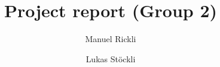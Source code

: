 
\title{Project report (Group 2)}
\author{Manuel Rickli \and Lukas Stöckli}

\maketitle











%

%
%
